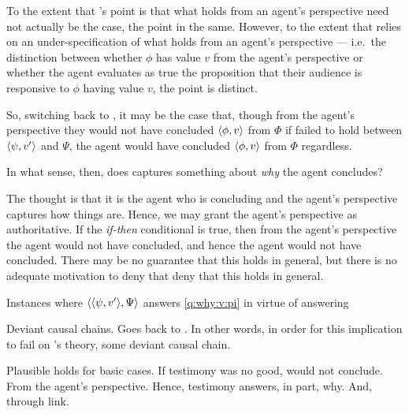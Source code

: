 \begin{note}
{  To the extent that \citeauthor{Harman:1973ww}'s point is that what holds from an agent's perspective need not actually be the case, the point in the same.
  However, to the extent that \citeauthor{Harman:1973ww} relies on an under-specification of what holds from an agent's perspective --- i.e.\ the distinction between whether \(\phi\) has value \(v\) from the agent's perspective or whether the agent evaluates as true the proposition that their audience is responsive to \(\phi\) having value \(v\), the point is distinct.
  }

  So, switching back to \qWhyV{}, it may be the case that, though from the agent's perspective they would not have concluded \(\langle \phi, v \rangle\) from \(\Phi\) if \support{} failed to hold between \(\langle \psi, v' \rangle\) and \(\Psi\), the agent would have concluded \(\langle \phi, v \rangle\) from \(\Phi\) regardless.

  In what sense, then, does \qWhyV{} captures something about \emph{why} the agent concludes?

  The thought is that it is the agent who is concluding and the agent's perspective captures how things are.
  Hence, we may grant the agent's perspective as authoritative.
  If the \emph{if-then} conditional is true, then from the agent's perspective the agent would not have concluded, and hence the agent would not have concluded.
  There may be no guarantee that this holds in general, but there is no adequate motivation to deny that deny that this holds in general.
\end{note}

\begin{note}
  \begin{proposition}
    Instances where \(\langle \langle \psi, v' \rangle, \Psi \rangle\) answers \autoref{q:why:v:pi} in virtue of answering \qWhyV{}
  \end{proposition}

\end{note}

\begin{note}
  Deviant causal chains.
  Goes back to \citeauthor{Davidson:1963aa}.
  In other words, in order for this implication to fail on \citeauthor{Davidson:1963aa}'s theory, some deviant causal chain.
\end{note}

\begin{note}
  Plausible holds for basic cases.
  If testimony was no good, would not conclude.
  From the agent's perspective.
  Hence, testimony answers, in part, why.
  And, through link.
\end{note}

